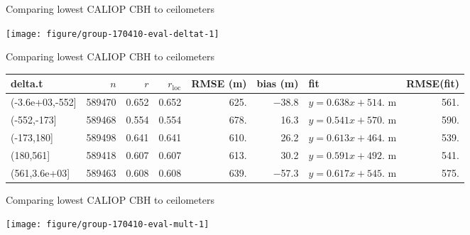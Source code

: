 \documentclass[10pt,notes=all,aspectratio=1610]{beamer}\usepackage[]{graphicx}\usepackage[]{color}
\newenvironment{knitrout}{}{} %
\begin{document}
\begin{frame}[fragile]{Comparing lowest CALIOP CBH to ceilometers}
\begin{knitrout}
\color{fgcolor}

{\centering \texttt{[image: figure/group-170410-eval-deltat-1]} 

}



\end{knitrout}
\end{frame}
\begin{frame}[fragile]{Comparing lowest CALIOP CBH to ceilometers}
  \begin{adjustbox}{max width=\textwidth}
\begin{tabular}{lrrrrrlr}
  \hline
\hline
delta.t & $n$ & $r$ & $r_\text{loc}$ & RMSE (m) & bias (m) & fit & RMSE(fit) \\ 
  \hline
(-3.6e+03,-552] & 589470 & 0.652 & 0.652 & 625. & $-$38.8 & $y = 0.638 x + 514.$ m & 561. \\ 
  (-552,-173] & 589468 & 0.554 & 0.554 & 678. & 16.3 & $y = 0.541 x + 570.$ m & 590. \\ 
  (-173,180] & 589498 & 0.641 & 0.641 & 610. & 26.2 & $y = 0.613 x + 464.$ m & 539. \\ 
  (180,561] & 589418 & 0.607 & 0.607 & 613. & 30.2 & $y = 0.591 x + 492.$ m & 541. \\ 
  (561,3.6e+03] & 589463 & 0.608 & 0.608 & 639. & $-$57.3 & $y = 0.617 x + 545.$ m & 575. \\ 
   \hline
\hline
\end{tabular}

  \end{adjustbox}
\end{frame}
\begin{frame}[fragile]{Comparing lowest CALIOP CBH to ceilometers}
\begin{knitrout}
\color{fgcolor}

{\centering \texttt{[image: figure/group-170410-eval-mult-1]} 

}



\end{knitrout}
\end{frame}
\end{document}

